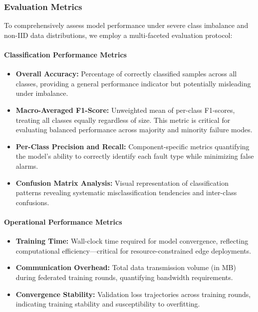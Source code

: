 \documentclass[12pt]{article}
\begin{document}
\subsubsection{Evaluation Metrics}

To comprehensively assess model performance under severe class imbalance and non-IID data distributions, we employ a multi-faceted evaluation protocol:

\paragraph{Classification Performance Metrics}
\begin{itemize}
    \item \textbf{Overall Accuracy:} Percentage of correctly classified samples across all classes, providing a general performance indicator but potentially misleading under imbalance.
    \item \textbf{Macro-Averaged F1-Score:} Unweighted mean of per-class F1-scores, treating all classes equally regardless of size. This metric is critical for evaluating balanced performance across majority and minority failure modes.
    \item \textbf{Per-Class Precision and Recall:} Component-specific metrics quantifying the model's ability to correctly identify each fault type while minimizing false alarms.
    \item \textbf{Confusion Matrix Analysis:} Visual representation of classification patterns revealing systematic misclassification tendencies and inter-class confusions.
\end{itemize}

\paragraph{Operational Performance Metrics}
\begin{itemize}
    \item \textbf{Training Time:} Wall-clock time required for model convergence, reflecting computational efficiency—critical for resource-constrained edge deployments.
    \item \textbf{Communication Overhead:} Total data transmission volume (in MB) during federated training rounds, quantifying bandwidth requirements.
    \item \textbf{Convergence Stability:} Validation loss trajectories across training rounds, indicating training stability and susceptibility to overfitting.
\end{itemize}
\end{document}
